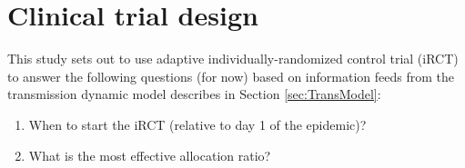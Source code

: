 \documentclass[a4paper]{article}
\begin{document}
	\newpage
	\section{Clinical trial design}
	\label{sec:TrialDesign}
	This study sets out to use adaptive individually-randomized control trial (iRCT) to answer the following questions (for now) based on information feeds from the transmission dynamic model describes in Section \ref{sec:TransModel}:
	\begin{enumerate}
		\item When to start the iRCT (relative to day 1 of the epidemic)?
		\item What is the most effective allocation ratio?
	\end{enumerate}
	
	
\newpage	
\label{Bibliography}


	
\end{document}
